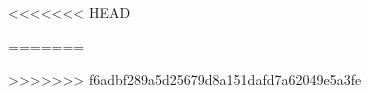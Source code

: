 \documentclass[pdftex,12pt, oneside]{book}
\begin{document}
\sloppy




\frontmatter%


  

\tableofcontents
\listoffigures

\mainmatter%
<<<<<<< HEAD





=======



>>>>>>> f6adbf289a5d25679d8a151dafd7a62049e5a3fe

\backmatter%
\printindex

\end{document}
